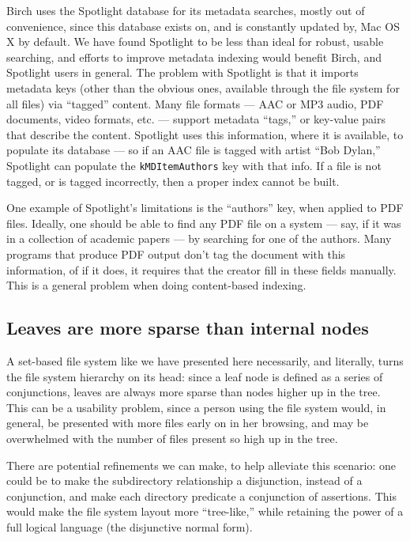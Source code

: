 \documentclass{article}
\begin{document}
Birch uses the Spotlight database for its metadata searches, mostly
out of convenience, since this database exists on, and is constantly
updated by, Mac OS X by default. We have found Spotlight to be less
than ideal for robust, usable searching, and efforts to improve
metadata indexing would benefit Birch, and Spotlight users in
general. The problem with Spotlight is that it imports metadata keys
(other than the obvious ones, available through the file system for
all files) via ``tagged'' content. Many file formats --- AAC or MP3
audio, PDF documents, video formats, etc. --- support metadata
``tags,'' or key-value pairs that describe the content. Spotlight uses
this information, where it is available, to populate its database ---
so if an AAC file is tagged with artist ``Bob Dylan,'' Spotlight can
populate the \texttt{kMDItemAuthors} key with that info. If a file is
not tagged, or is tagged incorrectly, then a proper index cannot be
built.

One example of Spotlight's limitations is the ``authors'' key, when
applied to PDF files. Ideally, one should be able to find any PDF
file on a system --- say, if it was in a collection of academic papers
--- by searching for one of the authors. Many programs that produce
PDF output don't tag the document with this information, of if it
does, it requires that the creator fill in these fields manually. This
is a general problem when doing content-based indexing.

\subsection{Leaves are more sparse than internal nodes}

A set-based file system like we have presented here necessarily, and
literally, turns the file system hierarchy on its head: since a leaf
node is defined as a series of conjunctions, leaves are always more
sparse than nodes higher up in the tree. This can be a usability
problem, since a person using the file system would, in general, be
presented with more files early on in her browsing, and may be
overwhelmed with the number of files present so high up in the tree.

There are potential refinements we can make, to help alleviate this
scenario: one could be to make the subdirectory relationship a
disjunction, instead of a conjunction, and make each directory
predicate a conjunction of assertions. This would make the file system
layout more ``tree-like,'' while retaining the power of a full logical
language (the disjunctive normal form).
\end{document}
